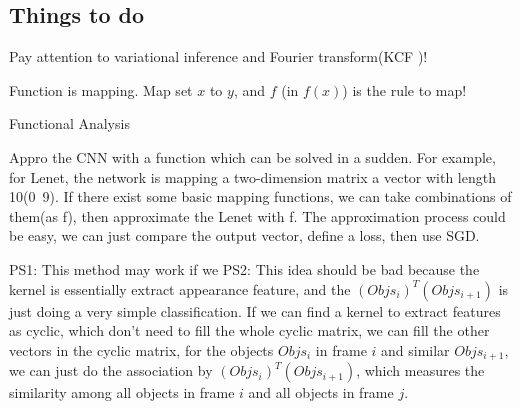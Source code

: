 \documentclass{article}
\begin{document}
\begin{spacing}{1.5}


\section{Things to do}
Pay attention to variational inference and Fourier transform(KCF )!

Function is mapping. Map set $x$ to $y$, and $f$ (in $f(x)$) is the rule to map!

Functional Analysis

Appro the CNN with a function which can be solved in a sudden. For example, for Lenet, the network is mapping a two-dimension matrix a vector with length 10(0~9). If there exist some basic mapping functions, we can take combinations of them(as f), then approximate the Lenet with f. The approximation process could be easy, we can just compare the output vector, define a loss, then use SGD.

PS1: This method may work if we PS2: This idea should be bad because the kernel is essentially extract appearance feature, and the $(Objs_i)^T(Objs_{i+1})$ is just doing a very simple classification. If we can find a kernel to extract features as cyclic, which don't need to fill the whole cyclic matrix, we can fill the other vectors in the cyclic matrix, for the objects $Objs_i$ in frame $i$ and similar $Objs_{i+1}$, we can just do the association by $(Objs_i)^T(Objs_{i+1})$, which measures the similarity among all objects in frame $i$ and all objects in frame $j$.
\end{spacing}
\end{document}
